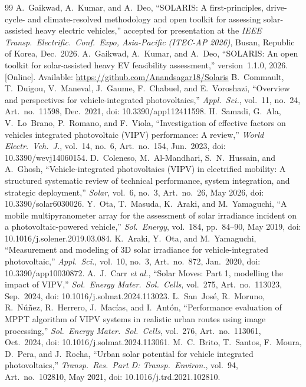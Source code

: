 \documentclass[lettersize,journal]{IEEEtran}
\begin{document}
\begin{thebibliography}{99}
\footnotesize
{} A.~Gaikwad, A.~Kumar, and A.~Deo, ``SOLARIS: A first-principles, drive-cycle- and climate-resolved methodology and open toolkit for assessing solar-assisted heavy electric vehicles,'' accepted for presentation at the \emph{IEEE Transp.\ Electrific.\ Conf.\ Expo, Asia-Pacific (ITEC-AP 2026)}, Busan, Republic of Korea, Dec.\ 2026.
 A.~Gaikwad, A.~Kumar, and A.~Deo, ``SOLARIS: An open toolkit for solar-assisted heavy EV feasibility assessment,'' version~1.1.0, 2026. [Online]. Available: \url{https://github.com/Anandsagar18/Solaris}
 B.~Commault, T.~Duigou, V.~Maneval, J.~Gaume, F.~Chabuel, and E.~Voroshazi, ``Overview and perspectives for vehicle-integrated photovoltaics,'' \emph{Appl.\ Sci.}, vol.~11, no.~24, Art.~no.~11598, Dec.\ 2021, doi: 10.3390/app112411598.
 H.~Samadi, G.~Ala, V.~Lo~Brano, P.~Romano, and F.~Viola, ``Investigation of effective factors on vehicles integrated photovoltaic (VIPV) performance: A review,'' \emph{World Electr.\ Veh.\ J.}, vol.~14, no.~6, Art.~no.~154, Jun.\ 2023, doi: 10.3390/wevj14060154.
 D.~Coleneso, M.~Al-Mandhari, S.~N.~Hussain, and A.~Ghosh, ``Vehicle-integrated photovoltaics (VIPV) in electrified mobility: A structured systematic review of technical performance, system integration, and strategic deployment,'' \emph{Solar}, vol.~6, no.~3, Art.~no.~26, May 2026, doi: 10.3390/solar6030026.
 Y.~Ota, T.~Masuda, K.~Araki, and M.~Yamaguchi, ``A mobile multipyranometer array for the assessment of solar irradiance incident on a photovoltaic-powered vehicle,'' \emph{Sol.\ Energy}, vol.~184, pp.~84--90, May 2019, doi: 10.1016/j.solener.2019.03.084.
 K.~Araki, Y.~Ota, and M.~Yamaguchi, ``Measurement and modeling of 3D solar irradiance for vehicle-integrated photovoltaic,'' \emph{Appl.\ Sci.}, vol.~10, no.~3, Art.~no.~872, Jan.\ 2020, doi: 10.3390/app10030872.
 A.~J.~Carr \emph{et al.}, ``Solar Moves: Part 1, modelling the impact of VIPV,'' \emph{Sol.\ Energy Mater.\ Sol.\ Cells}, vol.~275, Art.~no.~113023, Sep.\ 2024, doi: 10.1016/j.solmat.2024.113023.
 L.~San~Jos\'e, R.~Moruno, R.~N\'u\~nez, R.~Herrero, J.~Mac\'ias, and I.~Ant\'on, ``Performance evaluation of MPPT algorithm of VIPV systems in realistic urban routes using image processing,'' \emph{Sol.\ Energy Mater.\ Sol.\ Cells}, vol.~276, Art.~no.~113061, Oct.\ 2024, doi: 10.1016/j.solmat.2024.113061.
 M.~C.~Brito, T.~Santos, F.~Moura, D.~Pera, and J.~Rocha, ``Urban solar potential for vehicle integrated photovoltaics,'' \emph{Transp.\ Res.\ Part D: Transp.\ Environ.}, vol.~94, Art.~no.~102810, May 2021, doi: 10.1016/j.trd.2021.102810.

\end{thebibliography}
\end{document}
